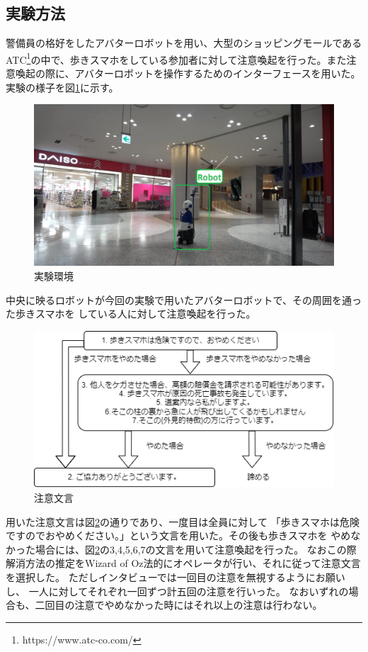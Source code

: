 \documentclass{kuisthesis}
\begin{document}
\subsection{実験方法}
警備員の格好をしたアバターロボットを用い、大型のショッピングモールであるATC\footnote{https://www.atc-co.com/}の中で、歩きスマホをしている参加者に対して注意喚起を行った。また注意喚起の際に、アバターロボットを操作するためのインターフェースを用いた。
実験の様子を図\ref{fig: Experiment}に示す。
\begin{figure}[htbp]
  \includegraphics[width=15cm]{img/Experiment.png}
  \caption{実験環境}
  \label{fig: Experiment}
\end{figure}
中央に映るロボットが今回の実験で用いたアバターロボットで、その周囲を通った歩きスマホを
している人に対して注意喚起を行った。
\begin{figure}[h]
  \includegraphics[width=15cm]{img/waystostop.drawio.png}
  \caption{注意文言}
  \label{fig: Strategy}
\end{figure}
用いた注意文言は図\ref{fig: Strategy}の通りであり、一度目は全員に対して
「歩きスマホは危険ですのでおやめください。」という文言を用いた。その後も歩きスマホを
やめなかった場合には、図\ref{fig: Strategy}の3,4,5,6,7の文言を用いて注意喚起を行った。
なおこの際解消方法の推定をWizard of Oz法的にオペレータが行い、それに従って注意文言を選択した。
ただしインタビューでは一回目の注意を無視するようにお願いし、
一人に対してそれぞれ一回ずつ計五回の注意を行いった。
なおいずれの場合も、二回目の注意でやめなかった時にはそれ以上の注意は行わない。
\end{document}

